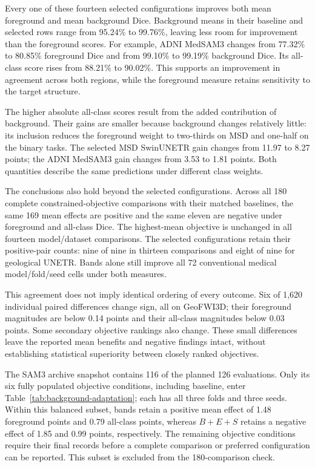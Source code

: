 \documentclass[12pt,a4paper]{article}
\begin{document}
Every one of these fourteen selected configurations improves both
mean foreground and mean background Dice. Background means in their
baseline and selected rows range from 95.24\% to 99.76\%, leaving
less room for improvement than the foreground scores. For example,
ADNI MedSAM3 changes from 77.32\% to 80.85\% foreground Dice and
from 99.10\% to 99.19\% background Dice. Its all-class score rises
from 88.21\% to 90.02\%. This supports an improvement in agreement
across both regions, while the foreground measure retains sensitivity
to the target structure.

The higher absolute all-class scores result from the added contribution
of background. Their gains are smaller because background changes
relatively little: its inclusion reduces the foreground weight to
two-thirds on MSD and one-half on the binary tasks. The selected
MSD SwinUNETR gain changes from 11.97 to 8.27 points; the ADNI
MedSAM3 gain changes from 3.53 to 1.81 points. Both quantities describe
the same predictions under different class weights.

The conclusions also hold beyond the selected configurations. Across
all 180 complete constrained-objective comparisons with their matched
baselines, the same 169 mean effects are positive and the same eleven
are negative under foreground and all-class Dice. The highest-mean
objective is unchanged in all fourteen model/dataset comparisons.
The selected configurations retain their positive-pair counts: nine
of nine in thirteen comparisons and eight of nine for geological
UNETR. Bands alone still improve all 72 conventional medical
model/fold/seed cells under both measures.

This agreement does not imply identical ordering of every outcome.
Six of 1,620 individual paired differences change sign, all on
GeoFWI3D; their foreground magnitudes are below 0.14 points and
their all-class magnitudes below 0.03 points. Some secondary objective
rankings also change. These small differences leave the reported
mean benefits and negative findings intact, without establishing
statistical superiority between closely ranked objectives.

The SAM3 archive snapshot contains 116 of the planned 126 evaluations.
Only its six fully populated objective conditions, including baseline,
enter Table~\ref{tab:background-adaptation}; each has all three folds
and three seeds. Within this balanced subset, bands retain a positive
mean effect of 1.48 foreground points and 0.79 all-class points,
whereas $B+E+S$ retains a negative effect of 1.85 and 0.99 points,
respectively. The remaining objective conditions require their final
records before a complete comparison or preferred configuration can
be reported. This subset is excluded from the 180-comparison check.
\end{document}
